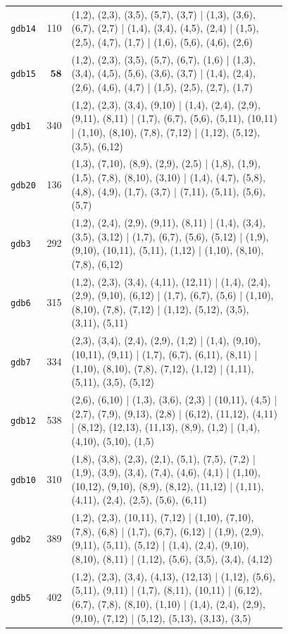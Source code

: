 \begin{landscape}
\begin{longtable}{lr>{\tiny\raggedright\arraybackslash}p{0.78\linewidth}}
\texttt{gdb14} & 110 & (1,2), (2,3), (3,5), (5,7), (3,7) | (1,3), (3,6), (6,7), (2,7) | (1,4), (3,4), (4,5), (2,4) | (1,5), (2,5), (4,7), (1,7) | (1,6), (5,6), (4,6), (2,6) \\[2pt]
\texttt{gdb15} & $\mathbf{58}$ & (1,2), (2,3), (3,5), (5,7), (6,7), (1,6) | (1,3), (3,4), (4,5), (5,6), (3,6), (3,7) | (1,4), (2,4), (2,6), (4,6), (4,7) | (1,5), (2,5), (2,7), (1,7) \\[2pt]
\texttt{gdb1} & 340 & (1,2), (2,3), (3,4), (9,10) | (1,4), (2,4), (2,9), (9,11), (8,11) | (1,7), (6,7), (5,6), (5,11), (10,11) | (1,10), (8,10), (7,8), (7,12) | (1,12), (5,12), (3,5), (6,12) \\[2pt]
\texttt{gdb20} & 136 & (1,3), (7,10), (8,9), (2,9), (2,5) | (1,8), (1,9), (1,5), (7,8), (8,10), (3,10) | (1,4), (4,7), (5,8), (4,8), (4,9), (1,7), (3,7) | (7,11), (5,11), (5,6), (5,7) \\[2pt]
\texttt{gdb3} & 292 & (1,2), (2,4), (2,9), (9,11), (8,11) | (1,4), (3,4), (3,5), (3,12) | (1,7), (6,7), (5,6), (5,12) | (1,9), (9,10), (10,11), (5,11), (1,12) | (1,10), (8,10), (7,8), (6,12) \\[2pt]
\texttt{gdb6} & 315 & (1,2), (2,3), (3,4), (4,11), (12,11) | (1,4), (2,4), (2,9), (9,10), (6,12) | (1,7), (6,7), (5,6) | (1,10), (8,10), (7,8), (7,12) | (1,12), (5,12), (3,5), (3,11), (5,11) \\[2pt]
\texttt{gdb7} & 334 & (2,3), (3,4), (2,4), (2,9), (1,2) | (1,4), (9,10), (10,11), (9,11) | (1,7), (6,7), (6,11), (8,11) | (1,10), (8,10), (7,8), (7,12), (1,12) | (1,11), (5,11), (3,5), (5,12) \\[2pt]
\texttt{gdb12} & 538 & (2,6), (6,10) | (1,3), (3,6), (2,3) | (10,11), (4,5) | (2,7), (7,9), (9,13), (2,8) | (6,12), (11,12), (4,11) | (8,12), (12,13), (11,13), (8,9), (1,2) | (1,4), (4,10), (5,10), (1,5) \\[2pt]
\texttt{gdb10} & 310 & (1,8), (3,8), (2,3), (2,1), (5,1), (7,5), (7,2) | (1,9), (3,9), (3,4), (7,4), (4,6), (4,1) | (1,10), (10,12), (9,10), (8,9), (8,12), (11,12) | (1,11), (4,11), (2,4), (2,5), (5,6), (6,11) \\[2pt]
\texttt{gdb2} & 389 & (1,2), (2,3), (10,11), (7,12) | (1,10), (7,10), (7,8), (6,8) | (1,7), (6,7), (6,12) | (1,9), (2,9), (9,11), (5,11), (5,12) | (1,4), (2,4), (9,10), (8,10), (8,11) | (1,12), (5,6), (3,5), (3,4), (4,12) \\[2pt]
\texttt{gdb5} & 402 & (1,2), (2,3), (3,4), (4,13), (12,13) | (1,12), (5,6), (5,11), (9,11) | (1,7), (8,11), (10,11) | (6,12), (6,7), (7,8), (8,10), (1,10) | (1,4), (2,4), (2,9), (9,10), (7,12) | (5,12), (5,13), (3,13), (3,5) \\[2pt]

\end{longtable}
\end{landscape}
